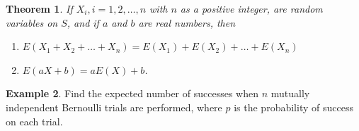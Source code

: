 \documentclass[letterpaper,10pt]{article}
\theoremstyle{plain}
\newtheorem{thm}{Theorem}[section]
\theoremstyle{definition}
\newtheorem{exmp}[thm]{Example}
\theoremstyle{remark}
\begin{document}
\begin{thm}
If \(X_i, i = 1, 2, \ldots, n\) with \(n\) as a positive integer, are random variables on \(S\), and if \(a\) and \(b\) are real numbers, then
\begin{enumerate}
    \item \(E(X_1 + X_2 + \ldots + X_n) = E(X_1) + E(X_2) + \ldots + E(X_n)\)
    \item \(E(aX + b) = aE(X) + b\).
\end{enumerate}

\end{thm}
\begin{exmp}
Find the expected number of successes when $n$ mutually independent Bernoulli trials are performed,
where $p$ is the probability of success on each trial.
\end{exmp}
\end{document}
